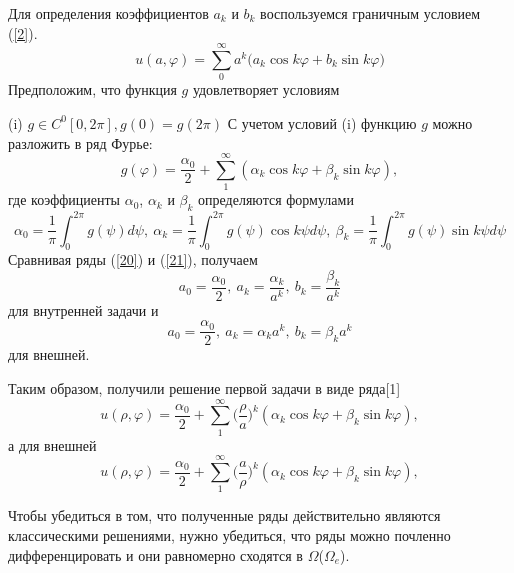 \documentclass[14pt, a4paper]{extarticle}
\let\oldref\ref
\renewcommand{\ref}[1]{(\oldref{#1})}
\begin{document}
			Для определения коэффициентов $a_k$ и $b_k$ воспользуемся граничным условием \ref{2}.
			\begin{equation}
				u(a, \varphi) = \sum_{0}^{\infty} a^k (a_k \cos{k\varphi} + b_k \sin{k\varphi)} \label{20}
			\end{equation}
			Предположим, что функция $g$ удовлетворяет условиям
			
			 (i) $g \in C^{0}[0, 2\pi], g(0) = g(2\pi)$
			 С учетом условий (i) функцию $g$ можно разложить в ряд Фурье:
			 \begin{equation}
			 	g(\varphi) = \dfrac{\alpha_0}{2} + \sum_{1}^{\infty} (\alpha_k \cos{k\varphi} + \beta_k \sin{k\varphi}), \label{21}
			 \end{equation}
			 где коэффициенты $\alpha_0$, $\alpha_k$ и $\beta_k$ определяются формулами
			 \begin{equation}
     		 	\alpha_0 = \dfrac{1}{\pi} \int_{0}^{2\pi} g(\psi)d\psi,\: \alpha_k = \dfrac{1}{\pi} \int_{0}^{2\pi} g(\psi) \cos{k\psi} d\psi, \: \beta_k = \dfrac{1}{\pi} \int_{0}^{2\pi} g(\psi) \sin{k\psi} d\psi
     		 \end{equation}
     		 Сравнивая ряды \ref{20} и \ref{21}, получаем
     		 \begin{equation}
     		 	a_0 = \dfrac{\alpha_0}{2}, \: a_k = \dfrac{\alpha_k}{a^k}, \: b_k = \dfrac{\beta_k}{a^k}
     		 \end{equation}
     		 для внутренней задачи и
     		 \begin{equation}
     		 	a_0 = \dfrac{\alpha_0}{2}, \: a_k = \alpha_k a^k, \: b_k = \beta_k a^k
     		 \end{equation}
     		 для внешней.
     		 
     		 Таким образом, получили решение первой задачи в виде ряда[1]
     		 \begin{equation}
  		 		u(\rho, \varphi) = \dfrac{\alpha_0}{2} + \sum_{1}^{\infty} \Big( \dfrac{\rho}{a} \Big)^k  (\alpha_k \cos{k\varphi} + \beta_k \sin{k\varphi}) , \label{25}
    		 \end{equation}
     		  а для внешней 
      		 \begin{equation}
     		  	u(\rho, \varphi) = \dfrac{\alpha_0}{2} + \sum_{1}^{\infty} \Big( \dfrac{a}{\rho} \Big)^k  (\alpha_k \cos{k\varphi} + \beta_k \sin{k\varphi}) , \label{26}
     		  \end{equation}
     		  
     		  Чтобы убедиться в том, что полученные ряды действительно являются классическими решениями, нужно убедиться, что ряды можно почленно дифференцировать и они равномерно сходятся в $\Omega$($\Omega_e$).
	     		  
\end{document}
